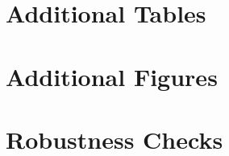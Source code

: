 \documentclass[12pt,letterpaper]{article}
\begin{document}
\newpage

\newpage
\begin{appendices}
\section{Additional Tables}


\section{Additional Figures}


\section{Robustness Checks}

\end{appendices}
\end{document}
